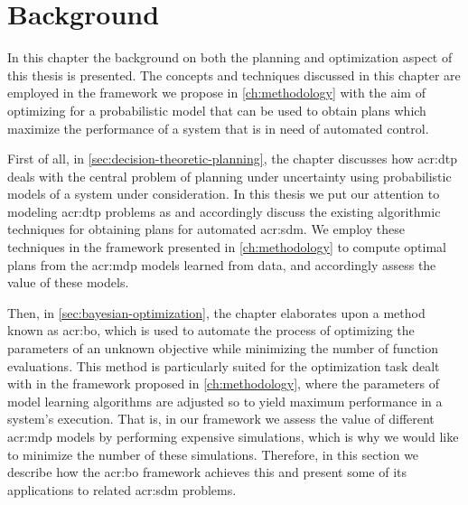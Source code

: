 \chapter{Background}
\label{ch:background}

In this chapter the background on both the planning and optimization aspect of this thesis is presented.
The concepts and techniques discussed in this chapter are employed in the framework we propose in \autoref{ch:methodology} with the aim of optimizing for a probabilistic model that can be used to obtain plans which maximize the performance of a system that is in need of automated control.

First of all, in \autoref{sec:decision-theoretic-planning}, the chapter discusses how \acrfull{acr:dtp} deals with the central problem of planning under uncertainty using probabilistic models of a system under consideration.
In this thesis we put our attention to modeling \acrshort{acr:dtp} problems as  and accordingly discuss the existing algorithmic techniques for obtaining plans for automated \acrfull{acr:sdm}.
We employ these techniques in the framework presented in \autoref{ch:methodology} to compute optimal plans from the \acrshort{acr:mdp} models learned from data, and accordingly assess the value of these models.

Then, in \autoref{sec:bayesian-optimization}, the chapter elaborates upon a method known as \acrfull{acr:bo}, which is used to automate the process of optimizing the parameters of an unknown objective while minimizing the number of function evaluations.
This method is particularly suited for the optimization task dealt with in the framework proposed in \autoref{ch:methodology}, where the parameters of model learning algorithms are adjusted so to yield maximum performance in a system's execution.
That is, in our framework we assess the value of different \acrshort{acr:mdp} models by performing expensive simulations, which is why we would like to minimize the number of these simulations.
Therefore, in this section we describe how the \acrshort{acr:bo} framework achieves this and present some of its applications to related \acrshort{acr:sdm} problems.




\newpage



